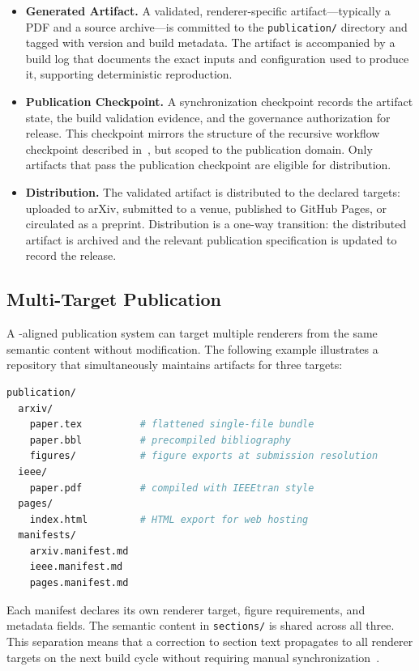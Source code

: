 \begin{itemize}
  \item \textbf{Generated Artifact.} A validated, renderer-specific artifact---typically a PDF and a source archive---is committed to the \texttt{publication/} directory and tagged with version and build metadata. The artifact is accompanied by a build log that documents the exact inputs and configuration used to produce it, supporting deterministic reproduction.

  \item \textbf{Publication Checkpoint.} A synchronization checkpoint records the artifact state, the build validation evidence, and the governance authorization for release. This checkpoint mirrors the structure of the recursive workflow checkpoint described in~, but scoped to the publication domain. Only artifacts that pass the publication checkpoint are eligible for distribution.

  \item \textbf{Distribution.} The validated artifact is distributed to the declared targets: uploaded to arXiv, submitted to a venue, published to GitHub Pages, or circulated as a preprint. Distribution is a one-way transition: the distributed artifact is archived and the relevant publication specification is updated to record the release.
\end{itemize}

\subsection{Multi-Target Publication}

A -aligned publication system can target multiple renderers from the same semantic content without modification. The following example illustrates a repository that simultaneously maintains artifacts for three targets:

\begin{lstlisting}[language=bash, caption={Multi-target publication artifact layout.}, label={lst:multi-target}]
publication/
  arxiv/
    paper.tex          # flattened single-file bundle
    paper.bbl          # precompiled bibliography
    figures/           # figure exports at submission resolution
  ieee/
    paper.pdf          # compiled with IEEEtran style
  pages/
    index.html         # HTML export for web hosting
  manifests/
    arxiv.manifest.md
    ieee.manifest.md
    pages.manifest.md
\end{lstlisting}

Each manifest declares its own renderer target, figure requirements, and metadata fields. The semantic content in \texttt{sections/} is shared across all three. This separation means that a correction to section text propagates to all renderer targets on the next build cycle without requiring manual synchronization~\cite{Chandy1985DistributedSnapshots}.

